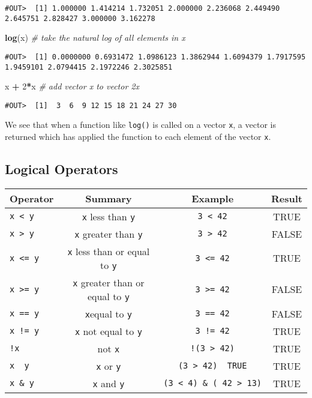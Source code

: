 \documentclass[]{book}
\newenvironment{Shaded}{\begin{snugshade}}{\end{snugshade}}
\newcommand{\CommentTok}[1]{\textcolor[rgb]{0.56,0.35,0.01}{\textit{#1}}}
\newcommand{\DecValTok}[1]{\textcolor[rgb]{0.00,0.00,0.81}{#1}}
\newcommand{\KeywordTok}[1]{\textcolor[rgb]{0.13,0.29,0.53}{\textbf{#1}}}
\newcommand{\NormalTok}[1]{#1}
\newcommand{\OperatorTok}[1]{\textcolor[rgb]{0.81,0.36,0.00}{\textbf{#1}}}
\newcommand{\StringTok}[1]{\textcolor[rgb]{0.31,0.60,0.02}{#1}}
\begin{document}
\begin{verbatim}
#OUT>  [1] 1.000000 1.414214 1.732051 2.000000 2.236068 2.449490 2.645751 2.828427 3.000000 3.162278
\end{verbatim}

\begin{Shaded}
\begin{Highlighting}[]
\KeywordTok{log}\NormalTok{(x)    }\CommentTok{# take the natural log of all elements in x}
\end{Highlighting}
\end{Shaded}

\begin{verbatim}
#OUT>  [1] 0.0000000 0.6931472 1.0986123 1.3862944 1.6094379 1.7917595 1.9459101 2.0794415 2.1972246 2.3025851
\end{verbatim}

\begin{Shaded}
\begin{Highlighting}[]
\NormalTok{x }\OperatorTok{+}\StringTok{ }\DecValTok{2}\OperatorTok{*}\NormalTok{x   }\CommentTok{# add vector x to vector 2x}
\end{Highlighting}
\end{Shaded}

\begin{verbatim}
#OUT>  [1]  3  6  9 12 15 18 21 24 27 30
\end{verbatim}

We see that when a function like \texttt{log()} is called on a vector \texttt{x}, a vector is returned which has applied the function to each element of the vector \texttt{x}.

\hypertarget{logical-operators}{%
\subsection{Logical Operators}\label{logical-operators}}

\begin{longtable}[]{@{}lccc@{}}
\toprule
Operator & Summary & Example & Result\tabularnewline
\midrule
\endhead
\texttt{x\ \textless{}\ y} & \texttt{x} less than \texttt{y} & \texttt{3\ \textless{}\ 42} & TRUE\tabularnewline
\texttt{x\ \textgreater{}\ y} & \texttt{x} greater than \texttt{y} & \texttt{3\ \textgreater{}\ 42} & FALSE\tabularnewline
\texttt{x\ \textless{}=\ y} & \texttt{x} less than or equal to \texttt{y} & \texttt{3\ \textless{}=\ 42} & TRUE\tabularnewline
\texttt{x\ \textgreater{}=\ y} & \texttt{x} greater than or equal to \texttt{y} & \texttt{3\ \textgreater{}=\ 42} & FALSE\tabularnewline
\texttt{x\ ==\ y} & \texttt{x}equal to \texttt{y} & \texttt{3\ ==\ 42} & FALSE\tabularnewline
\texttt{x\ !=\ y} & \texttt{x} not equal to \texttt{y} & \texttt{3\ !=\ 42} & TRUE\tabularnewline
\texttt{!x} & not \texttt{x} & \texttt{!(3\ \textgreater{}\ 42)} & TRUE\tabularnewline
\texttt{x\ \textbar{}\ y} & \texttt{x} or \texttt{y} & \texttt{(3\ \textgreater{}\ 42)\ \textbar{}\ TRUE} & TRUE\tabularnewline
\texttt{x\ \&\ y} & \texttt{x} and \texttt{y} & \texttt{(3\ \textless{}\ 4)\ \&\ (\ 42\ \textgreater{}\ 13)} & TRUE\tabularnewline
\bottomrule
\end{longtable}
\end{document}

